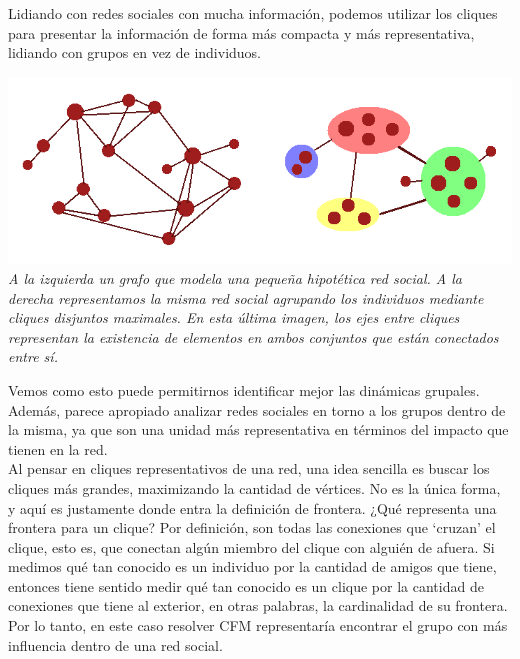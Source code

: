 Lidiando con redes sociales con mucha información, podemos utilizar los cliques para presentar la información de forma más compacta y más representativa, lidiando con grupos en vez de individuos. \\

\vspace{-1cm}
\begin{center}
	\includegraphics[scale=0.9]{informe/imgs/example.png}
	\textit{A la izquierda un grafo que modela una pequeña hipotética red social. A la derecha representamos la misma red social agrupando los individuos mediante cliques disjuntos maximales. En esta última imagen, los ejes entre cliques representan la existencia de elementos en ambos conjuntos que están conectados entre sí.}
\end{center}

Vemos como esto puede permitirnos identificar mejor las dinámicas grupales. Además, parece apropiado analizar redes sociales en torno a los grupos dentro de la misma, ya que son una unidad más representativa en términos del impacto que tienen en la red. \\

Al pensar en cliques representativos de una red, una idea sencilla es buscar los cliques más grandes, maximizando la cantidad de vértices. No es la única forma, y aquí es justamente donde entra la definición de frontera. ¿Qué representa una frontera para un clique? Por definición, son todas las conexiones que `cruzan' el clique, esto es, que conectan algún miembro del clique con alguién de afuera. Si medimos qué tan conocido es un individuo por la cantidad de amigos que tiene, entonces tiene sentido medir qué tan conocido es un clique por la cantidad de conexiones que tiene al exterior, en otras palabras, la cardinalidad de su frontera. Por lo tanto, en este caso resolver CFM representaría encontrar el grupo con más influencia dentro de una red social. \\

